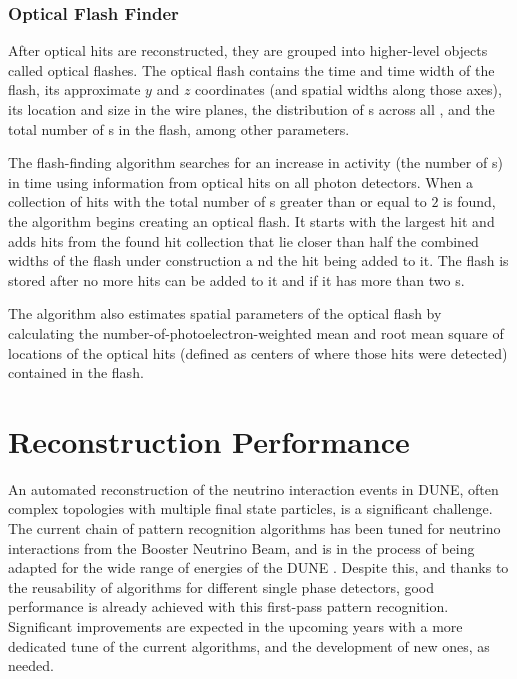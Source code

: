 \subsubsection{Optical Flash Finder}
After optical hits are reconstructed, they are grouped into higher-level objects called optical flashes.
The optical flash contains the time and time width of the flash,
its approximate $y$ and $z$ coordinates (and spatial widths along those axes),
its location and size in the wire planes,
the distribution of \phel{}s across all ,
and the total number of \phel{}s in the flash, among other parameters.

The flash-finding algorithm searches for an increase in  activity
(the number of \phel{}s) in time using information from optical hits
on all photon detectors.
When a collection of hits with the total number of \phel{}s  
greater than or equal to $2$ is found, the algorithm begins creating an optical flash.
It starts with the largest hit and adds hits from the found hit collection 
that lie closer than half the combined widths of the flash under construction
a nd the hit being added to it.
The flash is stored after no more hits can be added to it
and if it has more than two \phel{}s.

The algorithm also estimates spatial parameters of the optical flash
by calculating the number-of-photoelectron-weighted mean and 
root mean square of locations of the optical hits
(defined as centers of  where those hits were detected)
contained in the flash.

\section{Reconstruction Performance}
\label{sec:performance}

An automated reconstruction of the neutrino interaction events in DUNE, often complex topologies with multiple final state particles, is a significant challenge. The current chain of  pattern recognition algorithms %
has been tuned for neutrino interactions from the \fnal Booster Neutrino Beam, and is in the process of being adapted for the wide range of energies of the DUNE . Despite this, and thanks to the reusability of  algorithms for different single phase \lartpc detectors,  good performance is already achieved with this first-pass pattern recognition. Significant improvements are expected  in the upcoming years with a more dedicated tune of the current algorithms, and the development of new ones, as needed. %


